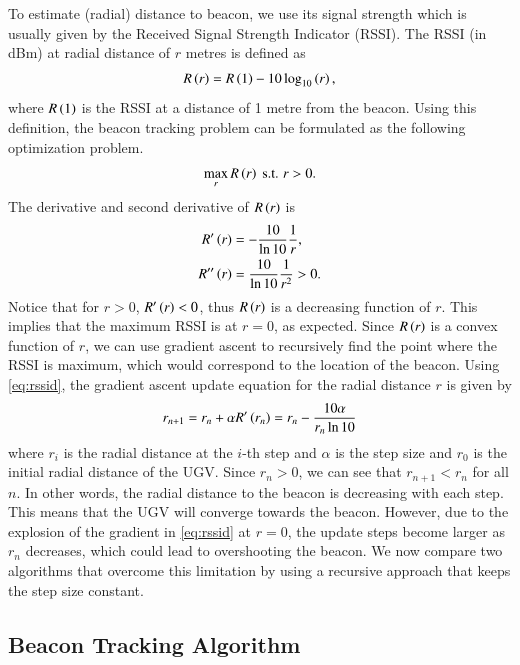 \documentclass[conference]{IEEEtran}
\begin{document}
To estimate (radial) distance to beacon, we use its signal strength which is
usually given by the Received Signal Strength Indicator (RSSI). The RSSI (in
dBm) at radial distance of \(r\) metres is defined as
\begin{align}
    R\left(r\right) = R\left(1\right) - 10\log_{10}\left(r\right),
    \label{eq:rssi}
\end{align}
where \(R\left(1\right)\) is the RSSI at a distance of 1 metre from the beacon. Using
this definition, the beacon tracking problem can be formulated as the following
optimization problem.
\begin{equation}
    \max_{r} R\left(r\right) \text{ s.t. } r > 0.
    \label{eq:rssopt}
\end{equation}
The derivative and second derivative of \(R\left(r\right)\) is
\begin{align}
    R^\prime\left(r\right) &= -\frac{10}{\ln{10}}\frac{1}{r}, \label{eq:rssid} \\
    R^{\prime\prime}\left(r\right) &= \frac{10}{\ln{10}}\frac{1}{r^2} > 0. \label{eq:rssidd}
\end{align}
Notice that for \(r > 0\), \(R^\prime\left(r\right) < 0\), thus \(R\left(r\right)\) is a
decreasing function of \(r\). This implies that the maximum RSSI is at \(r =
0\), as expected. Since \(R\left(r\right)\) is a convex function of \(r\), we can use
gradient ascent \cite{boydConvexOptimization2004a} to recursively find the point
where the RSSI is maximum, which would correspond to the location of the beacon.
Using \eqref{eq:rssid}, the gradient ascent update equation for the radial
distance \(r\) is given by
\begin{equation}
    r_{n+1} = r_n + \alpha R^\prime\left(r_n\right) = r_n - \frac{10\alpha}{r_n\ln{10}}
    \label{eq:gradient-ascent-upd}
\end{equation}
where \(r_i\) is the radial distance at the \(i\)-th step and \(\alpha\) is the
step size and \(r_0\) is the initial radial distance of the UGV. Since \(r_n >
0\), we can see that \(r_{n+1} < r_n\) for all \(n\). In other words, the radial
distance to the beacon is decreasing with each step. This means that the UGV
will converge towards the beacon. However, due to the explosion of the gradient
in \eqref{eq:rssid} at \(r = 0\), the update steps become larger as \(r_n\)
decreases, which could lead to overshooting the beacon. We now compare two
algorithms that overcome this limitation by using a recursive approach that
keeps the step size constant.

\subsection{Beacon Tracking Algorithm}
\label{subsec:beacon-tracking-algorithm}
\end{document}
